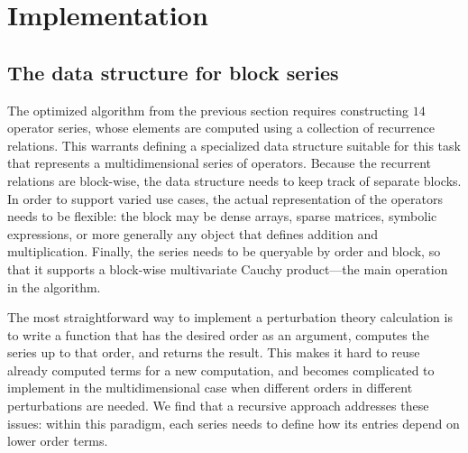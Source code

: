 \section{Implementation}
\label{sec:implementation}

\subsection{The data structure for block series}
\label{sec:BlockSeries}

The optimized algorithm from the previous section requires constructing $14$ operator series, whose elements are computed using a collection of recurrence relations.
This warrants defining a specialized data structure suitable for this task that represents a multidimensional series of operators.
Because the recurrent relations are block-wise, the data structure needs to keep track of separate blocks.
In order to support varied use cases, the actual representation of the operators needs to be flexible: the block may be dense arrays, sparse matrices, symbolic expressions, or more generally any object that defines addition and multiplication.
Finally, the series needs to be queryable by order and block, so that it supports a block-wise multivariate Cauchy product---the main operation in the algorithm.

The most straightforward way to implement a perturbation theory calculation is to write a function that has the desired order as an argument, computes the series up to that order, and returns the result.
This makes it hard to reuse already computed terms for a new computation, and becomes complicated to implement in the multidimensional case when different orders in different perturbations are needed.
We find that a recursive approach addresses these issues: within this paradigm, each series needs to define how its entries depend on lower order terms.

